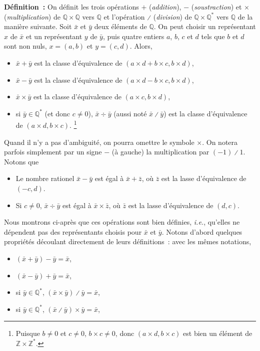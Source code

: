 \noindent\textbf{Définition :} On définit les trois opérations $+$ (\emph{addition}), $-$ (\emph{soustraction}) et $\times$ (\emph{multiplication}) de $\mathbb{Q} \times \mathbb{Q}$ vers $\mathbb{Q}$ et l'opération $\divslash$ (\emph{division}) de $\mathbb{Q} \times \mathbb{Q}^*$ vers $\mathbb{Q}$ de la manière suivante.  
Soit $\bar{x}$ et $\bar{y}$ deux éléments de $\mathbb{Q}$. 
On peut choisir un représentant $x$ de $\bar{x}$ et un représentant $y$ de $\bar{y}$, puis quatre entiers $a$, $b$, $c$ et $d$ tels que $b$ et $d$ sont non nuls, $x = (a, b)$ et $y = (c, d)$.
Alors, 
\begin{itemize}[nosep]
    \item \sindex[isy]{$+$} $\bar{x} + \bar{y}$ est la classe d'équivalence de $(a \times d + b \times c, b \times d)$,
    \item \sindex[isy]{$-$} $\bar{x} - \bar{y}$ est la classe d'équivalence de $(a \times d - b \times c, b \times d)$,
    \item \sindex[isy]{$\times$} $\bar{x} \times \bar{y}$ est la classe d'équivalence de $(a \times c, b \times d)$,
    \item \sindex[isy]{$\div$}\sindex[isy]{$\divslash$} si $\bar{y} \in \mathbb{Q}^*$ (et donc $c \neq 0$), $\bar{x} \div \bar{y}$ (aussi noté $\bar{x} \divslash \bar{y}$) est la classe d'équivalence de $(a \times d, b \times c)$.%
        \footnote{Puisque $b \neq 0$ et $c \neq 0$, $b \times c \neq 0$, donc $(a \times d, b \times c)$ est bien un élément de $\mathbb{Z} \times \mathbb{Z}^*$.}
\end{itemize}
Quand il n'y a pas d'ambiguité, on pourra omettre le symbole $\times$. 
On notera parfois simplement par un signe $-$ (à gauche) la multiplication par $(-1) \divslash 1$.
Notons que 
\begin{itemize}[nosep]
    \item Le nombre rationel $\bar{x} - \bar{y}$ est égal à $\bar{x} + \bar{z}$, où $\bar{z}$ est la lasse d'équivalence de $(-c, d)$.
    \item Si $c \neq 0$, $\bar{x} \div \bar{y}$ est égal à $\bar{x} \times \bar{z}$, où $\bar{z}$ est la lasse d'équivalence de $(d, c)$.
\end{itemize}

\medskip

Nous montrons ci-après que ces opérations sont bien définies, \emph{i.e.}, qu'elles ne dépendent pas des représentants choisis pour $\bar{x}$ et $\bar{y}$.
Notons d'abord quelques propriétés découlant directement de leurs définitions : avec les mêmes notations, 
\begin{itemize}[nosep]
    \item $(\bar{x} + \bar{y}) - \bar{y} = \bar{x}$,
    \item $(\bar{x} - \bar{y}) + \bar{y} = \bar{x}$,
    \item si $\bar{y} \in \mathbb{Q}^*$, $(\bar{x} \times \bar{y}) \divslash \bar{y} = \bar{x}$,
    \item si $\bar{y} \in \mathbb{Q}^*$, $(\bar{x} \divslash \bar{y}) \times \bar{y} = \bar{x}$,
\end{itemize}

